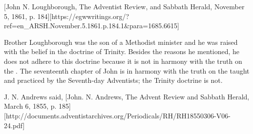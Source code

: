 [John N. Loughborough, The Adventist Review, and Sabbath Herald, November 5, 1861, p. 184][https://egwwritings.org/?ref=en\_ARSH.November.5.1861.p.184.1&para=1685.6615]

Brother Loughborough was the son of a Methodist minister and he was raised with the belief in the doctrine of Trinity. Besides the reasons he mentioned, he does not adhere to this doctrine because it is not in harmony with the truth on the . The seventeenth chapter of John is in harmony with the truth on the  taught and practiced by the Seventh-day Adventists; the Trinity doctrine is not. 

J. N. Andrews said, [John. N. Andrews, The Advent Review and Sabbath Herald, March 6, 1855, p. 185][http://documents.adventistarchives.org/Periodicals/RH/RH18550306-V06-24.pdf]

